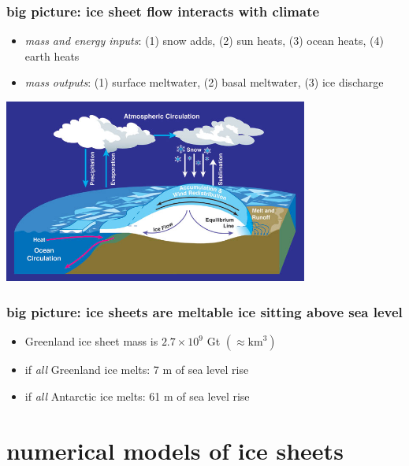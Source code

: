 \documentclass[hide notes,intlimits]{beamer}
\begin{document}
\begin{frame}
  \frametitle{big picture: ice sheet flow interacts with climate}

\medskip
\small
\begin{itemize}
\item \emph{mass and energy inputs}: (1) snow adds, (2) sun heats, (3) ocean heats, (4) earth heats
\item \emph{mass outputs}: (1) surface meltwater, (2) basal meltwater, (3) ice discharge
\end{itemize}

\begin{center}
  \includegraphics[width=0.75\textwidth]{mass-bal-atmos}
\end{center}
\end{frame}


\begin{frame}
  \frametitle{big picture: ice sheets are meltable ice sitting above sea level}

\small
\begin{itemize}
\item Greenland ice sheet mass is $2.7 \times 10^9$ Gt \quad $(\approx \text{km}^3)$ %
\item if \emph{all} Greenland ice melts: 7 m of sea level rise
\item if \emph{all} Antarctic ice melts: 61 m of sea level rise
\end{itemize}
\end{frame}



\section[numerical models]{numerical models of ice sheets}
\end{document}
